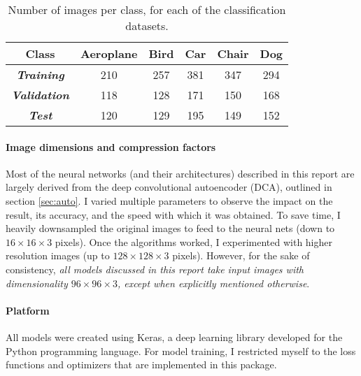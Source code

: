 \begingroup
\begin{table}[!htbp]
	\renewcommand{\arraystretch}{1.5}
	\centering

	\begin{tabular}{@{}cccccc@{}}
	\toprule
	          Class & \textbf{Aeroplane} & \textbf{Bird} & \textbf{Car} & \textbf{Chair} & \textbf{Dog} \\ \midrule
	\textit{\textbf{Training}}   & 210       & 257  & 381 & 347   & 294 \\
	\textit{\textbf{Validation}} & 118       & 128  & 171 & 150   & 168 \\
	\textit{\textbf{Test}}       & 120       & 129  & 195 & 149   & 152 \\ \bottomrule
	\end{tabular}
	\caption{Number of images per class, for each of the classification datasets.}
	\label{tab:classcounts}

\end{table}
\endgroup

\paragraph{Image dimensions and compression factors} Most of the neural networks (and their architectures) described in this report are largely derived from the deep convolutional autoencoder (DCA), outlined in section \textcolor{blue}{\ref{sec:auto}}. I varied multiple parameters to observe the impact on the result, its accuracy, and the speed with which it was obtained. To save time, I heavily downsampled the original images to feed to the neural nets (down to $16 \times 16 \times 3$ pixels). Once the algorithms worked, I experimented with higher resolution images (up to $128 \times 128 \times 3$ pixels). However, for the sake of consistency, \emph{all models discussed in this report take input images with dimensionality $96 \times 96 \times 3$, except when explicitly mentioned otherwise}.

\paragraph{Platform} All models were created using Keras, a deep learning library developed for the Python programming language. For model training, I restricted myself to the loss functions and optimizers that are implemented in this package.
